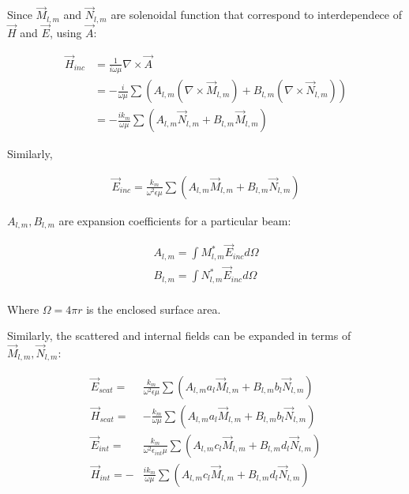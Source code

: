             Since $\vec{M}_{l,m}$ and $\vec{N}_{l,m}$ are solenoidal function that correspond to interdependece of $\vec{H}$ and $\vec{E}$, using $\vec{A}$:

            \begin{align}
                \vec{H}_{inc} &= \frac{1}{i\omega \mu}\nabla \times \vec{A} \\
                &= - \frac{i}{\omega\mu}\sum\left(A_{l,m}(\nabla\times\vec{M}_{l,m}) + B_{l,m}(\nabla\times\vec{N}_{l,m})\right) \\
                &= - \frac{ik_m}{\omega\mu}\sum\left(A_{l,m}\vec{N}_{l,m}+B_{l,m}\vec{M}_{l,m}\right)
            \end{align}

            Similarly,

            \begin{align}
                \vec{E}_{inc} = \frac{k_m}{\omega^2\epsilon\mu}\sum\left(A_{l,m}\vec{M}_{l,m} + B_{l,m}\vec{N}_{l,m}\right)
            \end{align}

            $A_{l,m}, B_{l,m}$ are expansion coefficients for a particular beam:

            \begin{align}
                A_{l,m} = \int M^*_{l,m}\vec{E}_{inc}d\Omega \\
                B_{l,m} = \int N^*_{l,m}\vec{E}_{inc}d\Omega \\
            \end{align}

            Where $\Omega = 4\pi r$ is the enclosed surface area.

            Similarly, the scattered and internal fields can be expanded in terms of $\vec{M}_{l,m}, \vec{N}_{l,m}$:

            \begin{align}
                \vec{E}_{scat}=& \frac{k_m}{\omega^2\epsilon\mu}\sum\left(A_{l,m}a_l\vec{M}_{l,m} + B_{l,m}b_l\vec{N}_{l,m}\right)\\
                \vec{H}_{scat}=&-\frac{k_m}{\omega\mu}\sum\left(A_{l,m}a_l\vec{M}_{l,m} + B_{l,m}b_l\vec{N}_{l,m}\right)\\
                \vec{E}_{int}=&\frac{k_m}{\omega^2\epsilon_{int}\mu}\sum\left(A_{l,m}c_l\vec{M}_{l,m} + B_{l,m}d_l\vec{N}_{l,m}\right)\\
                \vec{H}_{int}=-&\frac{ik_m}{\omega\mu}\sum\left(A_{l,m}c_l\vec{M}_{l,m} + B_{l,m}d_l\vec{N}_{l,m}\right)
            \end{align}

